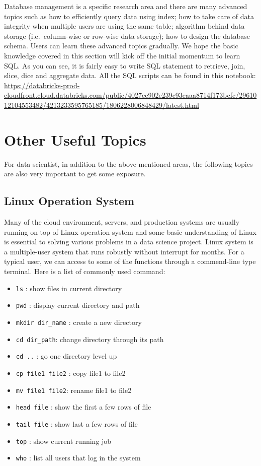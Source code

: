 \documentclass[]{book}
\providecommand{\tightlist}{%
  \setlength{\itemsep}{0pt}\setlength{\parskip}{0pt}}
\theoremstyle{definition}
\theoremstyle{definition}
\theoremstyle{remark}
\begin{document}
Database management is a specific research area and there are many
advanced topics such as how to efficiently query data using index; how
to take care of data integrity when multiple users are using the same
table; algorithm behind data storage (i.e.~column-wise or row-wise data
storage); how to design the database schema. Users can learn these
advanced topics gradually. We hope the basic knowledge covered in this
section will kick off the initial momentum to learn SQL. As you can see,
it is fairly easy to write SQL statement to retrieve, join, slice, dice
and aggregate data. All the SQL scripts can be found in this notebook:
\url{https://databricks-prod-cloudfront.cloud.databricks.com/public/4027ec902e239c93eaaa8714f173bcfc/2961012104553482/4213233595765185/1806228006848429/latest.html}

\section{Other Useful Topics}\label{other-useful-topics}

For data scientist, in addition to the above-mentioned areas, the
following topics are also very important to get some exposure.

\subsection{Linux Operation System}\label{linux-operation-system}

Many of the cloud environment, servers, and production systems are
usually running on top of Linux operation system and some basic
understanding of Linux is essential to solving various problems in a
data science project. Linux system is a multiple-user system that runs
robustly without interrupt for months. For a typical user, we can access
to some of the functions through a commend-line type terminal. Here is a
list of commonly used command:

\begin{itemize}
\tightlist
\item
  \texttt{ls} : show files in current directory
\item
  \texttt{pwd} : display current directory and path
\item
  \texttt{mkdir\ dir\_name} : create a new directory
\item
  \texttt{cd\ dir\_path}: change directory through its path
\item
  \texttt{cd\ ..} : go one directory level up\\
\item
  \texttt{cp\ file1\ file2} : copy file1 to file2
\item
  \texttt{mv\ file1\ file2}: rename file1 to file2
\item
  \texttt{head\ file} : show the first a few rows of file
\item
  \texttt{tail\ file} : show last a few rows of file
\item
  \texttt{top} : show current running job
\item
  \texttt{who} : list all users that log in the system
\end{itemize}
\end{document}
